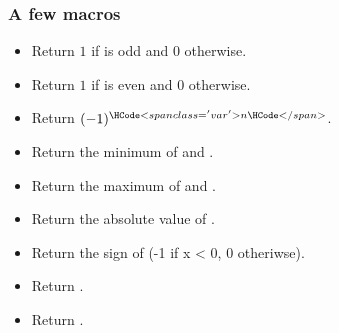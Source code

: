 \subsubsection{A few macros}
\begin{itemize}
\item {}
  \sshortdescribe Return $1$ if  is odd and $0$ otherwise.
\item {}
  \sshortdescribe Return $1$ if  is even and $0$ otherwise.
\item {}
  \sshortdescribe Return $(-1)^{\var{n}}$.
\item {}
  \sshortdescribe Return the minimum of  and .
\item {}
  \sshortdescribe Return the maximum of  and .
\item {}
  \sshortdescribe Return the absolute value of .
\item {}
  \sshortdescribe Return the sign of  (-1 if x < 0, 0 otheriwse).
\item {}
  \sshortdescribe Return .
\item {}
  \sshortdescribe Return .
\end{itemize}

